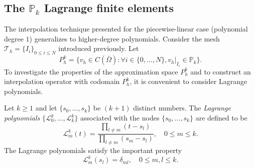 \subsection{The $\mathbb{P}_k$ Lagrange finite elements}
The interpolation technique presented for the piecewise-linear case (polynomial degree $1$) generalizes to higher-degree polynomials. Consider the mesh $\mathcal{T}_h = \{I_i\}_{0 \le i \le N}$ introduced previously. Let
\begin{equation}\label{eq:def-Phk}
    P_h^k = \{ v_h \in C(\bar{\Omega}): \forall i \in \{0, \dots, N\}, v_h|_{I_i} \in \mathbb{P}_k \}.
\end{equation}
To investigate the properties of the approximation space $P_h^k$ and to construct an interpolation operator with codomain $P_h^k$, it is convenient to consider Lagrange polynomials.
\begin{definition}\label{def:lagrange-polynomials}
    Let $k \ge 1$ and let $\{s_0, \dots, s_k\}$ be $(k+1)$ distinct numbers. The \emph{Lagrange polynomials} $\{\mathcal{L}_0^k, \dots, \mathcal{L}_k^k\}$ associated with the nodes $\{s_0, \dots, s_k\}$ are defined to be
    \begin{equation}
        \mathcal{L}_m^k(t) = \frac{\prod_{l \ne m}(t - s_l)}{\prod_{l \ne m}(s_m - s_l)}, \quad 0 \le m \le k.
    \end{equation}
    The Lagrange polynomials satisfy the important property
    \begin{equation}
        \mathcal{L}_m^k(s_l) = \delta_{ml}, \quad 0 \le m,l \le k.
    \end{equation}
\end{definition}


